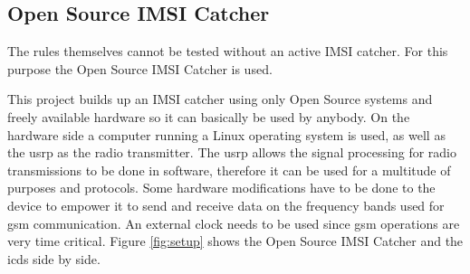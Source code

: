\subsection{Open Source IMSI Catcher}
The rules themselves cannot be tested without an active IMSI catcher.
For this purpose the Open Source IMSI Catcher \cite{dennis} is used.

This project builds up an IMSI catcher using only Open Source systems and freely available hardware so it can basically be used by anybody.
On the hardware side a computer running a Linux operating system is used, as well as the \gls{usrp} as the radio transmitter.
The \gls{usrp} allows the signal processing for radio transmissions to be done in software, therefore it can be used for a multitude of purposes and protocols.
Some hardware modifications have to be done to the device to empower it to send and receive data on the frequency bands used for \gls{gsm} communication.
An external clock needs to be used since \gls{gsm} operations are very time critical.
Figure \ref{fig:setup} shows the Open Source IMSI Catcher and the \gls{icds} side by side.

